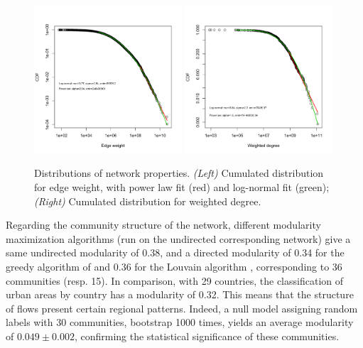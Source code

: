 \documentclass[11pt]{article}
\begin{document}
\begin{figure}
    \centering
    \includegraphics[width=0.49\textwidth]{figures/edgeweight.png}
    \includegraphics[width=0.49\textwidth]{figures/degreeDistr.png}
    \caption{Distributions of network properties. \textit{(Left)} Cumulated distribution for edge weight, with power law fit (red) and log-normal fit (green); \textit{(Right)} Cumulated distribution for weighted degree.}
    \label{fig:nwdist}
\end{figure}


Regarding the community structure of the network, different modularity maximization algorithms (run on the undirected corresponding network) give a same undirected modularity of 0.38, and a directed modularity \cite{nicosia2009extending} of 0.34 for the greedy algorithm of \cite{clauset2004finding} and 0.36 for the Louvain algorithm \cite{blondel2008fast}, corresponding to 36 communities (resp. 15). In comparison, with 29 countries, the classification of urban areas by country has a modularity of 0.32. This means that the structure of flows present certain regional patterns. Indeed, a null model assigning random labels with 30 communities, bootstrap 1000 times, yields an average modularity of $0.049 \pm 0.002$, confirming the statistical significance of these communities.
\end{document}
